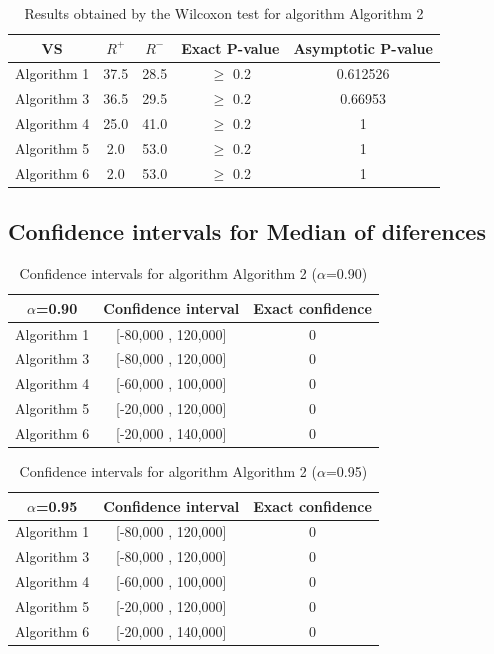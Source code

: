 \documentclass[a4paper,10pt]{article}
\begin{document}
\begin{table}[!htp]
\centering\small
\begin{tabular}{
|c|c|c|c|c|}
\hline
 VS & $R^{+}$ & $R^{-}$ & Exact P-value & Asymptotic P-value \\ \hline 
Algorithm 1 & 37.5 & 28.5 & $\geq$ 0.2 & 0.612526\\ \hline 
Algorithm 3 & 36.5 & 29.5 & $\geq$ 0.2 & 0.66953\\ \hline 
Algorithm 4 & 25.0 & 41.0 & $\geq$ 0.2 & 1\\ \hline 
Algorithm 5 & 2.0 & 53.0 & $\geq$ 0.2 & 1\\ \hline 
Algorithm 6 & 2.0 & 53.0 & $\geq$ 0.2 & 1\\ \hline 

\end{tabular}
\caption{Results obtained by the Wilcoxon test for algorithm Algorithm 2}
\end{table}

\subsection{Confidence intervals for Median of diferences}

\begin{table}[!htp]
\centering\small
\begin{tabular}{
|c|c|c|}
\hline
 $\alpha$=0.90 & Confidence interval & Exact confidence \\ \hline 
Algorithm 1 & [-80,000 , 120,000] & 0\\ \hline 
Algorithm 3 & [-80,000 , 120,000] & 0\\ \hline 
Algorithm 4 & [-60,000 , 100,000] & 0\\ \hline 
Algorithm 5 & [-20,000 , 120,000] & 0\\ \hline 
Algorithm 6 & [-20,000 , 140,000] & 0\\ \hline 

\end{tabular}
\caption{Confidence intervals for algorithm Algorithm 2 ($\alpha$=0.90)}
\end{table}
\begin{table}[!htp]
\centering\small
\begin{tabular}{
|c|c|c|}
\hline
 $\alpha$=0.95 & Confidence interval & Exact confidence \\ \hline 
Algorithm 1 & [-80,000 , 120,000] & 0\\ \hline 
Algorithm 3 & [-80,000 , 120,000] & 0\\ \hline 
Algorithm 4 & [-60,000 , 100,000] & 0\\ \hline 
Algorithm 5 & [-20,000 , 120,000] & 0\\ \hline 
Algorithm 6 & [-20,000 , 140,000] & 0\\ \hline 

\end{tabular}
\caption{Confidence intervals for algorithm Algorithm 2 ($\alpha$=0.95)}
\end{table}
\end{document}

